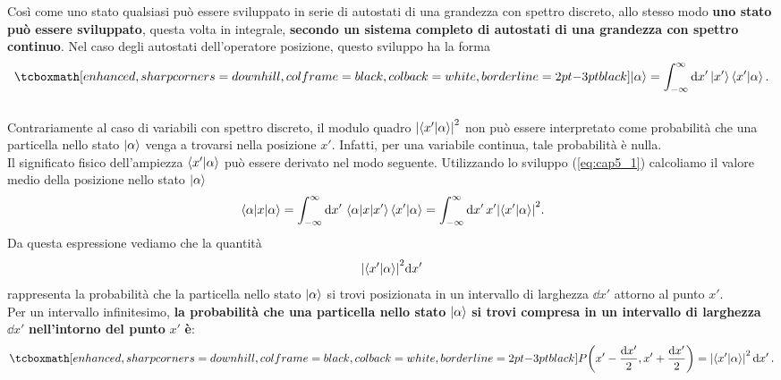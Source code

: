 \documentclass[a4paper,12pt,oneside]{book}
\begin{document}
Così come uno stato qualsiasi può essere sviluppato in serie di autostati di una grandezza con spettro discreto, allo stesso modo \textbf{uno stato può essere sviluppato}, questa volta in integrale, \textbf{secondo un sistema completo di autostati di una grandezza con spettro continuo}. Nel caso degli autostati dell'operatore posizione, questo sviluppo ha la forma
	\begin{equation}
 	\label{eq:cap5_1}
 		\tcboxmath[enhanced, sharp corners=downhill, colframe=black, colback=white, borderline={2pt}{-3pt}{black}]{
			\ket{\alpha} = \int_{-\infty}^{\infty}\dd{x'}\ket{x'}\braket{x'}{\alpha} .
			}
	\end{equation}\\
	
Contrariamente al caso di variabili con spettro discreto, il modulo quadro $\abs{\braket{x'}{\alpha}}^2$ non può essere interpretato come probabilità che una particella nello stato $\ket{\alpha}$ venga a trovarsi nella posizione $x'$. Infatti, per una variabile continua, tale probabilità è nulla.\\

Il significato fisico dell'ampiezza $\braket{x'}{\alpha}$ può essere derivato nel modo seguente. Utilizzando lo sviluppo (\ref{eq:cap5_1}) calcoliamo il valore medio della posizione nello stato $\ket{\alpha}$
	\begin{align}
 		 \ev{x}{\alpha} = \int_{-\infty}^{\infty}\dd{x'}\mel{\alpha}{x}{x'}\braket{x'}{\alpha}=\int_{-\infty}^{\infty}\dd{x'}x'\abs{\braket{x'}{\alpha}}^2 .
	\end{align}
Da questa espressione vediamo che la quantità
	\begin{equation}
 		\abs{\braket{x'}{\alpha}}^2\dd x'
	\end{equation}
rappresenta la probabilità che la particella nello stato $\ket{\alpha}$ si trovi posizionata in un intervallo di larghezza $\dd{x'}$ attorno al punto $x'$.\\

Per un intervallo infinitesimo, \textbf{la probabilità che una particella nello stato }$\ket{\alpha}$ \textbf{si trovi compresa in un intervallo di larghezza }$\dd{x'}$ \textbf{nell'intorno del punto }$x'$ \textbf{è}:
	\begin{equation}
		\tcboxmath[enhanced, sharp corners=downhill, colframe=black, colback=white, borderline={2pt}{-3pt}{black}]{	
			P\qty(x'-\frac{\dd{x'}}{2}, x'+\frac{\dd{x'}}{2}) = \abs{\braket{x'}{\alpha}}^2\dd{x'} .
			}
	\end{equation}\\
	
\end{document}
